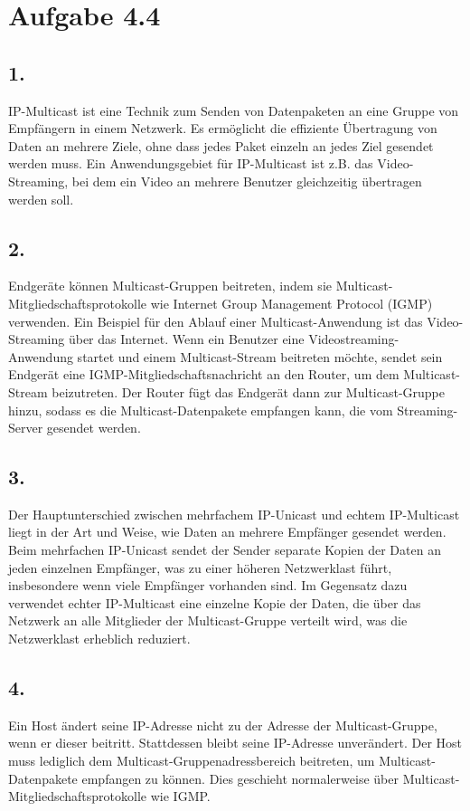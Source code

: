 \documentclass[a4paper]{scrartcl}
\begin{document}
\section*{Aufgabe 4.4}
\subsection*{1.}
IP-Multicast ist eine Technik zum Senden von Datenpaketen an eine Gruppe von Empfängern in einem Netzwerk. Es ermöglicht die effiziente Übertragung von Daten an mehrere Ziele, ohne dass jedes Paket einzeln an jedes Ziel gesendet werden muss. Ein Anwendungsgebiet für IP-Multicast ist z.B. das Video-Streaming, bei dem ein Video an mehrere Benutzer gleichzeitig übertragen werden soll.
\subsection*{2.}
Endgeräte können Multicast-Gruppen beitreten, indem sie Multicast-Mitgliedschaftsprotokolle wie Internet Group Management Protocol (IGMP) verwenden. Ein Beispiel für den Ablauf einer Multicast-Anwendung ist das Video-Streaming über das Internet. Wenn ein Benutzer eine Videostreaming-Anwendung startet und einem Multicast-Stream beitreten möchte, sendet sein Endgerät eine IGMP-Mitgliedschaftsnachricht an den Router, um dem Multicast-Stream beizutreten. Der Router fügt das Endgerät dann zur Multicast-Gruppe hinzu, sodass es die Multicast-Datenpakete empfangen kann, die vom Streaming-Server gesendet werden.
\subsection*{3.}
Der Hauptunterschied zwischen mehrfachem IP-Unicast und echtem IP-Multicast liegt in der Art und Weise, wie Daten an mehrere Empfänger gesendet werden. Beim mehrfachen IP-Unicast sendet der Sender separate Kopien der Daten an jeden einzelnen Empfänger, was zu einer höheren Netzwerklast führt, insbesondere wenn viele Empfänger vorhanden sind. Im Gegensatz dazu verwendet echter IP-Multicast eine einzelne Kopie der Daten, die über das Netzwerk an alle Mitglieder der Multicast-Gruppe verteilt wird, was die Netzwerklast erheblich reduziert.
\subsection*{4.}
Ein Host ändert seine IP-Adresse nicht zu der Adresse der Multicast-Gruppe, wenn er dieser beitritt. Stattdessen bleibt seine IP-Adresse unverändert. Der Host muss lediglich dem Multicast-Gruppenadressbereich beitreten, um Multicast-Datenpakete empfangen zu können. Dies geschieht normalerweise über Multicast-Mitgliedschaftsprotokolle wie IGMP. 
\end{document}

